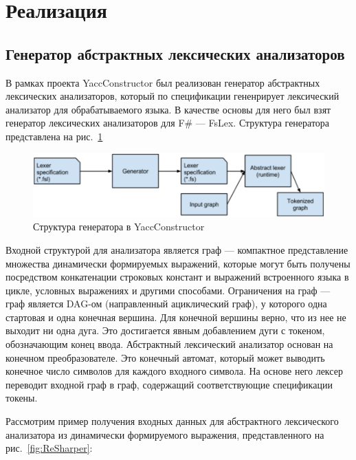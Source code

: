 \section{Реализация}


\subsection {Генератор абстрактных лексических анализаторов}

В рамках проекта YaccConstructor был реализован генератор абстрактных лексических анализаторов, который по спецификации гененрирует лексический 
анализатор для обрабатываемого языка. В качестве основы для него был взят генератор лексических анализаторов для F\# --- FsLex. 
Структура генератора представлена на рис.~\ref{fig:Generator}

\begin{figure}[t]
\centering
\includegraphics[width=\textwidth]{Polubelova/Generator}
\caption{Структура генератора в YaccConstructor}
\label{fig:Generator} 
\end{figure}

Входной структурой для анализатора является граф --- компактное представление множества динамически формируемых выражений, которые могут быть получены 
посредством конкатенации строковых констант и выражений встроенного языка в цикле, условных выражениях и другими способами. Ограничения на граф --- граф 
является DAG-ом (направленный ациклический граф), у которого одна стартовая и одна конечная вершина. Для конечной вершины верно, что из нее не выходит ни 
одна дуга. Это достигается явным добавлением дуги с токеном, обозначающим конец ввода. Абстрактный лексический анализатор основан на конечном преобразователе. 
Это конечный автомат, который может выводить конечное число символов для каждого входного символа. На основе него лексер переводит входной граф в граф, 
содержащий соответствующие спецификации токены. 

Рассмотрим пример получения входных данных для абстрактного лексического анализатора  из динамически формируемого выражения, представленного 
на рис.~\ref{fig:ReSharper}:
	
